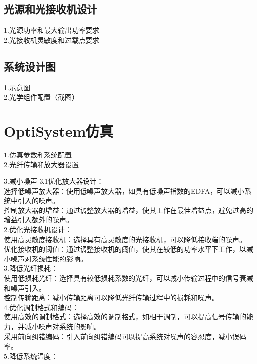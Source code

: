 \documentclass[12pt, a4paper, oneside]{article}
\begin{document}
\begin{spacing}{2.0}
\subsection{光源和光接收机设计}
1.光源功率和最大输出功率要求\\
2.光接收机灵敏度和过载点要求\\


\subsection{系统设计图}
1.示意图\\



2.光学组件配置（截图）



\section{OptiSystem仿真}
1.仿真参数和系统配置\\



2.光纤传输和放大器设置

3.减小噪声
3.1优化放大器设计：\\

选择低噪声放大器：使用低噪声放大器，如具有低噪声指数的EDFA，可以减小系统中引入的噪声。
\\
控制放大器的增益：通过调整放大器的增益，使其工作在最佳增益点，避免过高的增益引入额外的噪声。
\\
2.优化光接收机设计：
\\
使用高灵敏度接收机：选择具有高灵敏度的光接收机，可以降低接收端的噪声。
\\
优化接收机的阈值：通过调整接收机的阈值，使其在较低的功率水平下工作，以减小噪声对系统性能的影响。
\\
3.降低光纤损耗：
\\
使用低损耗光纤：选择具有较低损耗系数的光纤，可以减小传输过程中的信号衰减和噪声引入。\\
控制传输距离：减小传输距离可以降低光纤传输过程中的损耗和噪声。\\
4.优化调制格式和编码：\\

使用高效的调制格式：选择高效的调制格式，如相干调制，可以提高信号传输的能力，并减小噪声对系统的影响。\\
采用前向纠错编码：引入前向纠错编码可以提高系统对噪声的容忍度，减小误码率。\\
5.降低系统温度：\\


\end{spacing}
\end{document}
